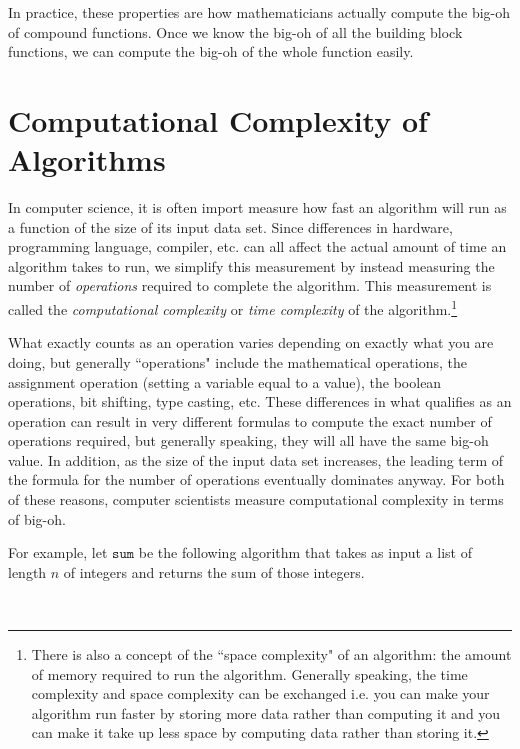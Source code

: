 \documentclass[11pt,oneside]{book}
\theoremstyle{definition}
\begin{document}
In practice, these properties are how mathematicians actually compute the big-oh of compound functions.
Once we know the big-oh of all the building block functions, we can compute the big-oh of the whole function easily.


\section{Computational Complexity of Algorithms}
In computer science, it is often import measure how fast an algorithm will run as a function of the size of its input data set.
Since differences in hardware, programming language, compiler, etc. can all affect the actual amount of time an algorithm takes to run, we simplify this measurement by instead measuring the number of \emph{operations} required to complete the algorithm.
This measurement is called the \emph{computational complexity} or \emph{time complexity} of the algorithm.\footnote{
    There is also a concept of the ``space complexity" of an algorithm: the amount of memory required to run the algorithm.
    Generally speaking, the time complexity and space complexity can be exchanged i.e. you can make your algorithm run faster by storing more data rather than computing it and you can make it take up less space by computing data rather than storing it.
}

What exactly counts as an operation varies depending on exactly what you are doing, but generally ``operations" include the mathematical operations, the assignment operation (setting a variable equal to a value), the boolean operations, bit shifting, type casting, etc.
These differences in what qualifies as an operation can result in very different formulas to compute the exact number of operations required, but generally speaking, they will all have the same big-oh value.
In addition, as the size of the input data set increases, the leading term of the formula for the number of operations eventually dominates anyway.
For both of these reasons, computer scientists measure computational complexity in terms of big-oh.

For example, let $\texttt{sum}$ be the following algorithm that takes as input a list of length $n$ of integers and returns the sum of those integers.

\
\end{document}
